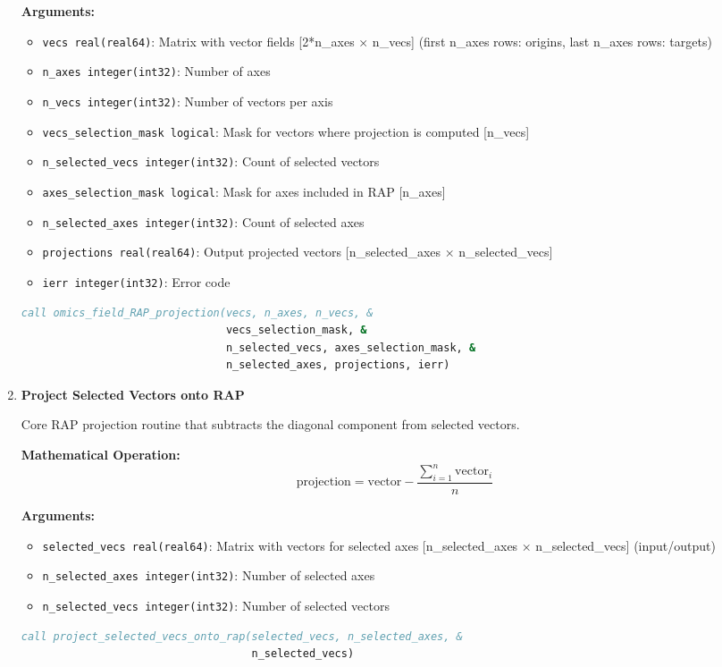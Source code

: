 \documentclass[11pt]{article}
\begin{document}
\begin{enumerate}
    \textbf{Arguments:}
    \begin{itemize}
        \item \texttt{vecs real(real64)}: Matrix with vector fields [2*n\_axes × n\_vecs] (first n\_axes rows: origins, last n\_axes rows: targets)
        \item \texttt{n\_axes integer(int32)}: Number of axes
        \item \texttt{n\_vecs integer(int32)}: Number of vectors per axis
        \item \texttt{vecs\_selection\_mask logical}: Mask for vectors where projection is computed [n\_vecs]
        \item \texttt{n\_selected\_vecs integer(int32)}: Count of selected vectors
        \item \texttt{axes\_selection\_mask logical}: Mask for axes included in RAP [n\_axes]
        \item \texttt{n\_selected\_axes integer(int32)}: Count of selected axes
        \item \texttt{projections real(real64)}: Output projected vectors [n\_selected\_axes × n\_selected\_vecs]
        \item \texttt{ierr integer(int32)}: Error code
    \end{itemize}
\begin{lstlisting}[language=Fortran, caption={Vector Field RAP Projection}]
call omics_field_RAP_projection(vecs, n_axes, n_vecs, &
                                vecs_selection_mask, &
                                n_selected_vecs, axes_selection_mask, &
                                n_selected_axes, projections, ierr)
\end{lstlisting}

    \item \textbf{Project Selected Vectors onto RAP}

    Core RAP projection routine that subtracts the diagonal component from selected vectors.
    
    \textbf{Mathematical Operation:}
    \[ \text{projection} = \text{vector} - \frac{\sum_{i=1}^{n}\text{vector}_i}{n} \]
    
    \textbf{Arguments:}
    \begin{itemize}
        \item \texttt{selected\_vecs real(real64)}: Matrix with vectors for selected axes [n\_selected\_axes × n\_selected\_vecs] (input/output)
        \item \texttt{n\_selected\_axes integer(int32)}: Number of selected axes
        \item \texttt{n\_selected\_vecs integer(int32)}: Number of selected vectors
    \end{itemize}
\begin{lstlisting}[language=Fortran, caption={Core RAP Projection}]
call project_selected_vecs_onto_rap(selected_vecs, n_selected_axes, &
                                    n_selected_vecs)
\end{lstlisting}


\end{enumerate}
\end{document}
